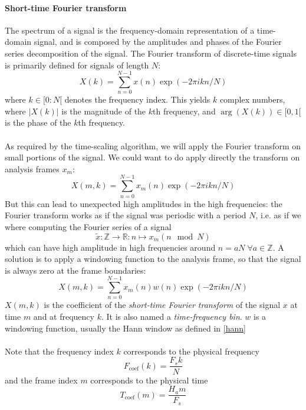 \documentclass[letterpaper]{article}
\begin{document}
\paragraph{Short-time Fourier transform}
The spectrum of a signal is the frequency-domain representation of
a time-domain signal, and is composed by the amplitudes and phases of the
Fourier series decomposition of the signal. The Fourier transform of
discrete-time signals is primarily defined for signals of length \(N\):
\begin{equation}
  X(k) = \sum_{n=0}^{N-1}x(n)\exp(-2\pi ikn/N)
\end{equation}
where \(k\in [0:N[\) denotes the frequency index. This yields \(k\) complex
numbers, where \(|X(k)|\) is the magnitude of the \(k\)th frequency, and
\(\arg(X(k))\in[0,1[\) is the phase of the \(k\)th frequency.
\paragraph{}
As required by the time-scaling algorithm, we will apply the Fourier transform
on small portions of the signal. We could want to do apply directly the
transform on analysis frames \(x_m\):
\begin{equation*}
X(m,k)=\sum_{n=0}^{N-1}x_m(n)\exp(-2\pi ikn/N)
\end{equation*}
But this can lead to unexpected high amplitudes in the high frequencies:
the Fourier transform works as if the signal was periodic with a period \(N\),
i.e. as if we where computing the Fourier series of a signal
\begin{equation}
\tilde x:\mathbb{Z}\to\mathbb{R}:n\mapsto x_m(n\mod N)
\end{equation}
which can have high amplitude in high frequencies around
\(n=aN\;\forall a\in\mathbb{Z}\).
A solution is to apply a windowing function to the analysis frame, so that the
signal is always zero at the frame boundaries:
\begin{equation}
    X(m,k) = \sum_{n=0}^{N-1}x_m(n)w(n)\exp(-2\pi ikn/N)
\end{equation}
\(X(m,k)\) is the coefficient of the \emph{short-time Fourier transform} of
the signal \(x\) at time \(m\) and at frequency \(k\). It is also named a
\emph{time-frequency bin}. \(w\) is a windowing function, usually the Hann
window as defined in \eqref{hann}
\paragraph{}
Note that the frequency index \(k\) corresponds to the physical frequency
\begin{equation}
    F_{\text{coef}}(k) = \frac{F_s k}{N}
\end{equation}
and the frame index \(m\) corresponds to the physical time
\begin{equation}
    T_{\text{coef}}(m) = \frac{H_a m}{F_s}
\end{equation}
\end{document}
